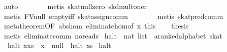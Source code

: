 \begin{isabellebody}
\ auto\isanewline
\ \ \ \ \ \ \isamarkupfalse%
\ {}metis\ skat{}null{}zero\ skd{}mult{}oner{}\isanewline
\ \ \ \ \ \ \isamarkupfalse%
\ {}metis\ FV{}null\ empty{}iff\ skat{}assign{}comm{}\isanewline
\ \ \ \ \ \ \isamarkupfalse%
\ {}metis\ skat{}pred{}comm{}\isanewline
\ \ \isamarkupfalse%
\isanewline
\ \ \isamarkupfalse%
\ metatheorem{}OF\ abs{}hom\ eliminate{}hom{}of\ x{}\ this{}\isanewline
\ \ \isamarkupfalse%
\ {}thesis\isanewline
\ \ \ \ \isamarkupfalse%
\ {}metis\ eliminate{}comm\ no{}reads{}\isanewline
{}\isamarkupfalse%
%
\endisatagproof
{\isafoldproof}%
%
\isadelimproof
\isanewline
%
\endisadelimproof
\isanewline
{}\isamarkupfalse%
\ halt\ {}{}\ {}nat\ list\ {}\ {}a{}{}ranked{}alphabet\ skat{}\ \isanewline
\ \ {}halt\ {}x{}xs{}\ {}\ x\ {}{}\ null\ {}\ halt\ xs{}\isanewline
{}\ {}halt\ {}{}\ {}\ {}{}\isanewline

\end{isabellebody}
